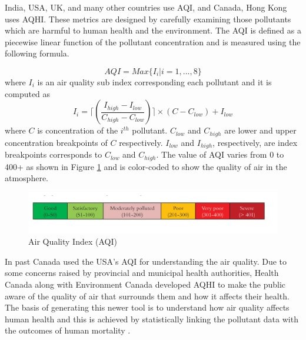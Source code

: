 India, USA, UK, and many other countries use AQI, and Canada, Hong Kong uses AQHI. These metrics are designed by carefully examining those pollutants which are harmful to human health and the environment.
The AQI is defined as a piecewise linear function of the pollutant concentration \cite{Soni2016} and is measured using the following formula.

\begin{equation}
AQI = Max \{I_i|i = 1, ..., 8\}
\end{equation}
where $I_i$ is an air quality sub index corresponding each pollutant and it is computed as 
\begin{equation}
I_i = \lceil(\frac{I_{high} - I_{low}}{C_{high} - C_{low}})\rceil \times (C - C_{low}) + I_{low}
\end{equation}
where $C$ is concentration of the $i^{th}$ pollutant. $C_{low}$ and $C_{high}$ are lower and upper concentration breakpoints of $C$ respectively.
$I_{low}$ and $I_{high}$, respectively, are index breakpoints corresponds to $C_{low}$ and $C_{high}$.  The value of AQI varies from 0 to 400+ as shown in Figure \ref{aqi} and is color-coded to show the quality of air in the atmosphere.


\begin{figure}[h]
    \begin{center}
    \includegraphics[scale=0.58]{./images/figure13.png}
    \end{center}
   
    \caption{Air Quality Index (AQI) \cite{AirQualityIndex}}
    
    \label{aqi}
\end{figure}

In past Canada used the USA's AQI for understanding the air quality. Due to some concerns raised by provincial and municipal health authorities, Health Canada along with Environment Canada developed AQHI to make the public aware of the quality of air that surrounds them and how it affects their health. The basis of generating this newer tool is to understand how air quality affects human health and this is achieved by statistically linking the pollutant data with the outcomes of human mortality \cite{hasselback2010air}.

